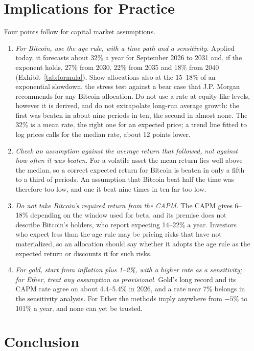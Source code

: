 \documentclass[12pt]{article}
\theoremstyle{plain}
\theoremstyle{remark}
\begin{document}
\section{Implications for Practice}\label{sec:practice}

Four points follow for capital market assumptions.

\begin{enumerate}
\item \emph{For Bitcoin, use the age rule, with a time path and a sensitivity.} Applied today, it forecasts about 32\% a year for September 2026 to 2031 and, if the exponent holds, 27\% from 2030, 22\% from 2035 and 18\% from 2040 (Exhibit~\ref{tab:formula}). Show allocations also at the 15--18\% of an exponential slowdown, the stress test against a bear case that J.P. Morgan recommends for any Bitcoin allocation. Do not use a rate at equity-like levels, however it is derived, and do not extrapolate long-run average growth: the first was beaten in about nine periods in ten, the second in almost none. The 32\% is a mean rate, the right one for an expected price; a trend line fitted to log prices calls for the median rate, about 12 points lower.
\item \emph{Check an assumption against the average return that followed, not against how often it was beaten.} For a volatile asset the mean return lies well above the median, so a correct expected return for Bitcoin is beaten in only a fifth to a third of periods. An assumption that Bitcoin beat half the time was therefore too low, and one it beat nine times in ten far too low.
\item \emph{Do not take Bitcoin's required return from the CAPM.} The CAPM gives 6--18\% depending on the window used for beta, and its premise does not describe Bitcoin's holders, who report expecting 14--22\% a year. Investors who expect less than the age rule may be pricing risks that have not materialized, so an allocation should say whether it adopts the age rule as the expected return or discounts it for such risks.
\item \emph{For gold, start from inflation plus 1--2\%, with a higher rate as a sensitivity; for Ether, treat any assumption as provisional.} Gold's long record and its CAPM rate agree on about 4.4--5.4\% in 2026, and a rate near 7\% belongs in the sensitivity analysis. For Ether the methods imply anywhere from $-5$\% to 101\% a year, and none can yet be trusted.
\end{enumerate}

\section{Conclusion}\label{sec:conclusion}
\end{document}
